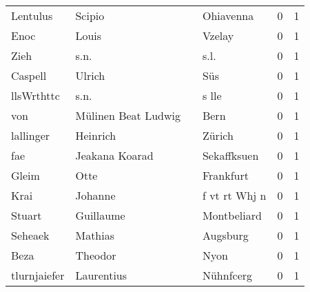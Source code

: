 \begin{tabular}{llllrr}
                 Lentulus &                             Scipio &             &                                   Ohiavenna &          0 &         1 \\
                     Enoc &                              Louis &             &                                      Vzelay &          0 &         1 \\
                     Zieh &                               s.n. &             &                                        s.l. &          0 &         1 \\
                  Caspell &                             Ulrich &             &                                         Süs &          0 &         1 \\
               llsWrthttc &                               s.n. &             &                                       s lle &          0 &         1 \\
                      von &                Mülinen Beat Ludwig &             &                                        Bern &          0 &         1 \\
                lallinger &                           Heinrich &             &                                      Zürich &          0 &         1 \\
                      fae &                     Jeakana Koarad &             &                                 Sekaffksuen &          0 &         1 \\
                    Gleim &                               Otte &             &                                   Frankfurt &          0 &         1 \\
                     Krai &                            Johanne &             &                               f vt rt Whj n &          0 &         1 \\
                   Stuart &                          Guillaume &             &                                 Montbeliard &          0 &         1 \\
                  Seheaek &                            Mathias &             &                                    Augsburg &          0 &         1 \\
                     Beza &                            Theodor &             &                                        Nyon &          0 &         1 \\
             tlurnjaiefer &                         Laurentius &             &                                   Nühnfcerg &          0 &         1 \\

\end{tabular}
